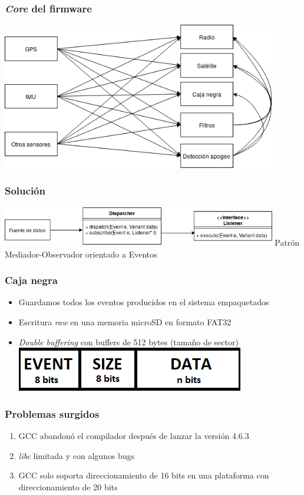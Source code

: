 \documentclass[numfooter]{beamer}
\begin{document}
    \begin{frame}
        \frametitle{\textit{Core} del firmware}
        \centering
        \includegraphics[width=0.9\textwidth]{images/problema.png}
    \end{frame}
    \begin{frame}
        \frametitle{Solución}
        \centering
        \includegraphics[width=0.9\textwidth]{images/solucion.png}
        \vfill
        Patrón Mediador-Observador orientado a Eventos
    \end{frame}
    \begin{frame}
        \frametitle{Caja negra}
        \begin{itemize}
            \item Guardamos todos los eventos producidos en el sistema empaquetados
            \item Escritura \textit{raw} en una memoria microSD en formato FAT32
            \item \textit{Double buffering} con buffers de 512 bytes (tamaño de sector)
            \vfill
            \centering
            \includegraphics{images/packet.png}
        \end{itemize}
    \end{frame}
    \begin{frame}
        \frametitle{Problemas surgidos}
        \begin{enumerate}
            \item GCC abandonó el compilador después de lanzar la versión 4.6.3
            \item \textit{libc} limitada y con algunos bugs
            \item GCC solo soporta direccionamiento de 16 bits en una plataforma con direccionamiento de 20 bits
        \end{enumerate}
    \end{frame}
\end{document}
